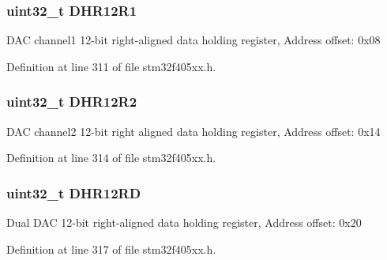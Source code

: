 \subsubsection[{\texorpdfstring{D\+H\+R12\+R1}{DHR12R1}}]{ uint32\+\_\+t D\+H\+R12\+R1}\hypertarget{struct_d_a_c___type_def_ac2bb55b037b800a25852736afdd7a258}{}\label{struct_d_a_c___type_def_ac2bb55b037b800a25852736afdd7a258}
D\+AC channel1 12-\/bit right-\/aligned data holding register, Address offset\+: 0x08 

Definition at line 311 of file stm32f405xx.\+h.

\subsubsection[{\texorpdfstring{D\+H\+R12\+R2}{DHR12R2}}]{ uint32\+\_\+t D\+H\+R12\+R2}\hypertarget{struct_d_a_c___type_def_a804c7e15dbb587c7ea25511f6a7809f7}{}\label{struct_d_a_c___type_def_a804c7e15dbb587c7ea25511f6a7809f7}
D\+AC channel2 12-\/bit right aligned data holding register, Address offset\+: 0x14 

Definition at line 314 of file stm32f405xx.\+h.

\subsubsection[{\texorpdfstring{D\+H\+R12\+RD}{DHR12RD}}]{ uint32\+\_\+t D\+H\+R12\+RD}\hypertarget{struct_d_a_c___type_def_a1590b77e57f17e75193da259da72095e}{}\label{struct_d_a_c___type_def_a1590b77e57f17e75193da259da72095e}
Dual D\+AC 12-\/bit right-\/aligned data holding register, Address offset\+: 0x20 

Definition at line 317 of file stm32f405xx.\+h.

